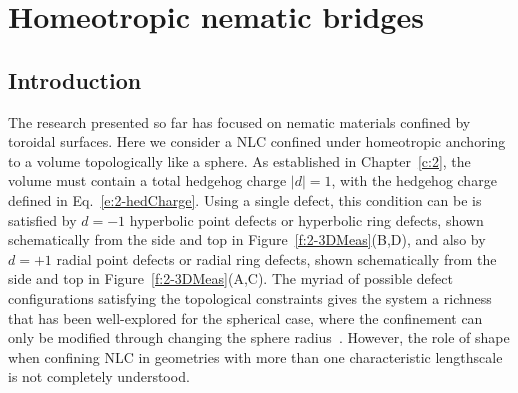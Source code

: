 \chapter{Homeotropic nematic bridges}

\section{Introduction}
The research presented so far has focused on nematic materials confined by toroidal surfaces.
Here we consider a NLC confined under homeotropic anchoring to a volume topologically like a sphere.
As established in Chapter~\ref{c:2}, the volume must contain a total hedgehog charge $|d| = 1$, with the hedgehog charge defined in Eq.~\ref{e:2-hedCharge}.
Using a single defect, this condition can be is satisfied by $d=-1$ hyperbolic point defects or hyperbolic ring defects, shown schematically from the side and top in Figure~\ref{f:2-3DMeas}(B,D), and also by $d=+1$ radial point defects or radial ring defects, shown schematically from the side and top in Figure~\ref{f:2-3DMeas}(A,C).
The myriad of possible defect configurations satisfying the topological constraints gives the system a richness that has been well-explored for the spherical case, where the confinement can only be modified through changing the sphere radius~\cite{RN150,RN277,RN278,RN275,RN276}.
However, the role of shape when confining NLC in geometries with more than one characteristic lengthscale is not completely understood.

